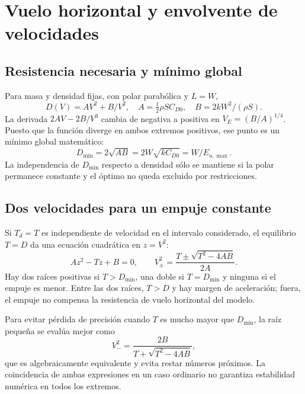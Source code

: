 \chapter{Vuelo horizontal y envolvente de velocidades}\label{ch:nivelado}

\section{Resistencia necesaria y mínimo global}
Para masa y densidad fijas, con polar parabólica y $L=W$,
\begin{equation}
D(V)=AV^2+B/V^2,\quad
A=\tfrac12\rho SC_{D0},\quad B=2kW^2/(\rho S).
\end{equation}
La derivada $2AV-2B/V^3$ cambia de negativa a positiva en $V_E=(B/A)^{1/4}$. Puesto que la función diverge en ambos extremos positivos, ese punto es un mínimo global matemático:
\begin{equation}
D_{\min}=2\sqrt{AB}=2W\sqrt{kC_{D0}}=W/E_{a,\max}.
\end{equation}
La independencia de $D_{\min}$ respecto a densidad sólo se mantiene si la polar permanece constante y el óptimo no queda excluido por restricciones.


\section{Dos velocidades para un empuje constante}
Si $T_d=T$ es independiente de velocidad en el intervalo considerado, el equilibrio $T=D$ da una ecuación cuadrática en $z=V^2$:
\begin{equation}
Az^2-Tz+B=0,\qquad
V_{\pm}^2=\frac{T\pm\sqrt{T^2-4AB}}{2A}.
\label{eq:jetroots}
\end{equation}
Hay dos raíces positivas si $T>D_{\min}$, una doble si $T=D_{\min}$ y ninguna si el empuje es menor. Entre las dos raíces, $T>D$ y hay margen de aceleración; fuera, el empuje no compensa la resistencia de vuelo horizontal del modelo.

Para evitar pérdida de precisión cuando $T$ es mucho mayor que $D_{\min}$, la raíz pequeña se evalúa mejor como
\begin{equation}
V_-^2=\frac{2B}{T+\sqrt{T^2-4AB}},
\end{equation}
que es algebraicamente equivalente y evita restar números próximos. La coincidencia de ambas expresiones en un caso ordinario no garantiza estabilidad numérica en todos los extremos.

